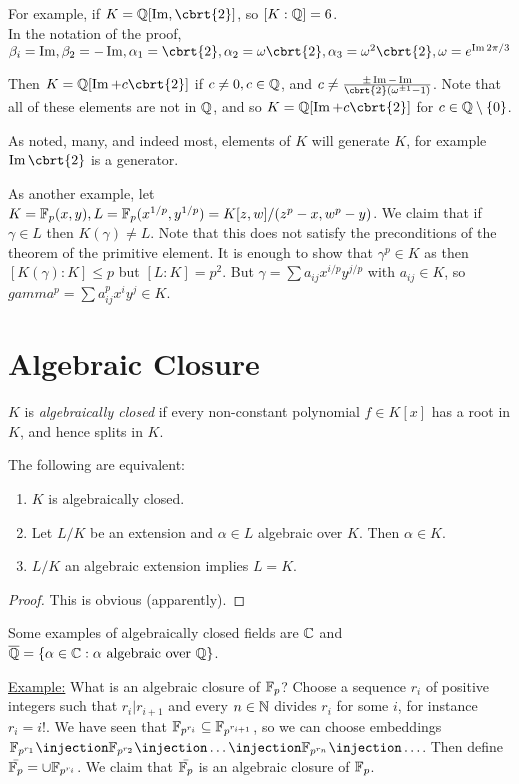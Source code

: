\documentclass[a4paper, 10pt, twocolumn]{amsart}
\begin{document}
For example, if $K = \Q[\im, \cbrt{2}]$, so $[K:\mathbb{Q}] = 6$.\\
In the notation of the proof, $\beta_i = \im, \beta_2 = - \im, \alpha_1 = \cbrt{2}, \alpha_2 = \omega \cbrt{2}, \alpha_3= \omega^2\cbrt{2}, \omega=e^{\im2\pi/3}$

Then $K=\Q[\im+c\cbrt{2}]$ if $c\neq 0, c \in \mathbb{Q}$, and $c \neq \frac{\pm\im-\im}{\cbrt{2}(\omega^{\pm 1}-1)}$. Note that all of these elements are not in $\mathbb{Q}$, and so $K = \Q[\im+c\cbrt{2}]$ for $c\in \mathbb{Q}\setminus\{0\}$.

As noted, many, and indeed most, elements of $K$ will generate $K$, for example $\im\cbrt{2}$ is a generator.

As another example, let $K = \mathbb{F}_p(x,y), L = \mathbb{F}_p(x^{1/p}, y^{1/p}) = K[z,w]/(z^p-x, w^p-y)$. We claim that if $\gamma \in L$ then $K(\gamma) \neq L$. Note that this does not satisfy the preconditions of the theorem of the primitive element. It is enough to show that $\gamma^p \in K$ as then $[K(\gamma):K] \leq p$ but $[L:K] = p^2$. But $\gamma = \sum a_{ij}x^{i/p}y^{j/p}$ with $a_{ij} \in K$, so $gamma^p =\sum a_{ij}^p x^i y^j \in K$.

\section{Algebraic Closure}
$K$ is \emph{algebraically closed} if every non-constant polynomial $f \in K[x]$ has a root in $K$, and hence splits in $K$. 
\begin{lemma}
The following are equivalent:
\begin{enumerate}
\item $K$ is algebraically closed.
\item Let $L/K$ be an extension and $\alpha \in L$ algebraic over $K$. Then $\alpha \in K$.
\item $L/K$ an algebraic extension implies $L=K$.
\end{enumerate}
\end{lemma}
\begin{proof}
This is obvious (apparently).
\end{proof}
Some examples of algebraically closed fields are $\mathbb{C}$ and $\overline{\mathbb{Q}} = \{\alpha \in \mathbb{C} : \alpha \text{ algebraic over } \mathbb{Q}\}$.

\underline{Example:} What is an algebraic closure of $\mathbb{F}_p$? Choose a sequence $r_i$ of positive integers such that $r_i | r_{i+1}$ and every $n \in \mathbb{N}$ divides $r_i$ for some $i$, for instance $r_i = i!$. We have seen that $\mathbb{F}_{p^{r_i}} \subseteq \mathbb{F}_{p^{r_{i+1}}}$, so we can choose embeddings $\F_{p^{r_1}} \injection \F_{p^{r_2}} \injection \ldots \injection \F_{p^{r_n}} \injection \ldots$. Then define $\bar{\mathbb{F}_p}= \cup \mathbb{F}_{p^{r_i}}$. We claim that $\bar{\mathbb{F}_p}$ is an algebraic closure of $\mathbb{F}_p$.
\end{document}
